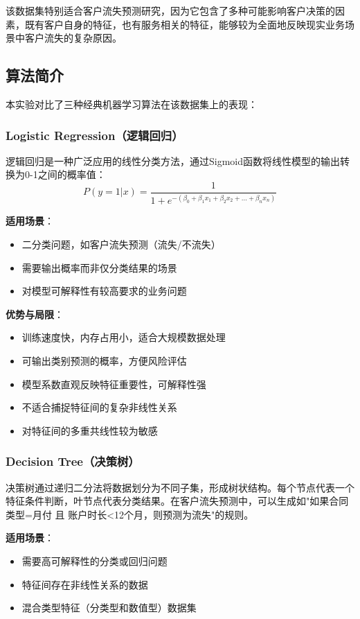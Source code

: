 \documentclass[12pt,a4paper]{article}
\begin{document}
该数据集特别适合客户流失预测研究，因为它包含了多种可能影响客户决策的因素，既有客户自身的特征，也有服务相关的特征，能够较为全面地反映现实业务场景中客户流失的复杂原因。

\subsection{算法简介}
本实验对比了三种经典机器学习算法在该数据集上的表现：

\subsubsection{Logistic Regression（逻辑回归）}
逻辑回归是一种广泛应用的线性分类方法，通过Sigmoid函数将线性模型的输出转换为0-1之间的概率值：
\begin{equation}
P(y=1|x) = \frac{1}{1 + e^{-(\beta_0 + \beta_1 x_1 + \beta_2 x_2 + ... + \beta_n x_n)}}
\end{equation}

\textbf{适用场景}：
\begin{itemize}
    \item 二分类问题，如客户流失预测（流失/不流失）
    \item 需要输出概率而非仅分类结果的场景
    \item 对模型可解释性有较高要求的业务问题
\end{itemize}

\textbf{优势与局限}：
\begin{itemize}
    \item 训练速度快，内存占用小，适合大规模数据处理
    \item 可输出类别预测的概率，方便风险评估
    \item 模型系数直观反映特征重要性，可解释性强
    \item 不适合捕捉特征间的复杂非线性关系
    \item 对特征间的多重共线性较为敏感
\end{itemize}

\subsubsection{Decision Tree（决策树）}
决策树通过递归二分法将数据划分为不同子集，形成树状结构。每个节点代表一个特征条件判断，叶节点代表分类结果。在客户流失预测中，可以生成如"如果合同类型=月付 且 账户时长<12个月，则预测为流失"的规则。

\textbf{适用场景}：
\begin{itemize}
    \item 需要高可解释性的分类或回归问题
    \item 特征间存在非线性关系的数据
    \item 混合类型特征（分类型和数值型）数据集
\end{itemize}
\end{document}
